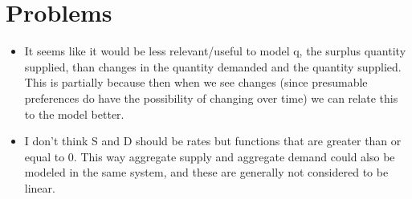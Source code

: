 \documentclass{article}
\begin{document}
\section{Problems}
\begin{itemize}
	\item It seems like it would be less relevant/useful to model q, the surplus quantity supplied, than changes in the quantity demanded and the quantity supplied. This is partially because then when we see changes (since presumable preferences do have the possibility of changing over time) we can relate this to the model better.
	\item I don't think S and D should be rates but functions that are greater than or equal to 0. This way aggregate supply and aggregate demand could also be modeled in the same system, and these are generally not considered to be linear.
\end{itemize}
\end{document}
